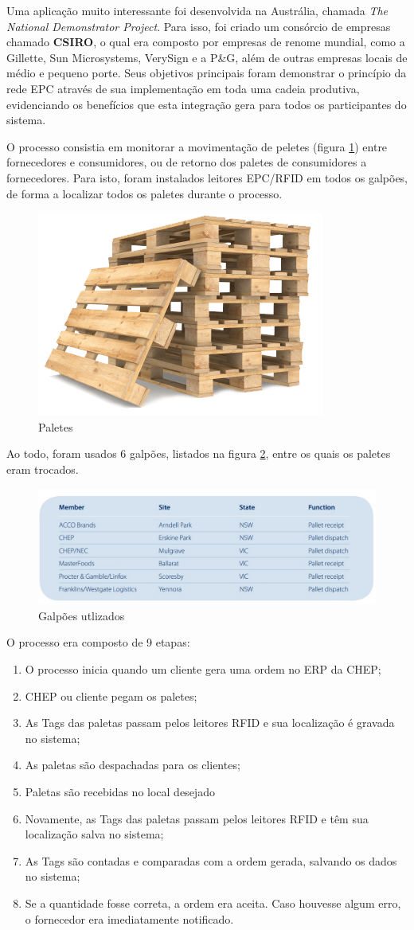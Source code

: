 \documentclass[a4paper,12pt,titlepage]{article}
\begin{document}
	Uma aplicação muito interessante foi desenvolvida na Austrália, chamada \textit{The National Demonstrator Project}. Para isso, foi criado um consórcio de empresas chamado \textbf{CSIRO}, o qual era composto por empresas de renome mundial, como a Gillette, Sun Microsystems, VerySign e a P\&G, além de outras empresas locais de médio e pequeno porte. Seus objetivos principais foram demonstrar o princípio da rede EPC através de sua implementação em toda uma cadeia produtiva, evidenciando os benefícios que esta integração gera para todos os participantes do sistema. 
	
	O processo consistia em monitorar a movimentação de peletes (figura \ref{fig:palete}) entre fornecedores e consumidores, ou de retorno dos paletes de consumidores a fornecedores. Para isto, foram instalados leitores EPC/RFID em todos os galpões, de forma a localizar todos os paletes durante o processo.
	
	\begin{figure}[h!]
		\centering
		\includegraphics[width=0.2\linewidth]{pallet}
		\caption{Paletes}
		\label{fig:palete}
	\end{figure}

	Ao todo, foram usados 6 galpões, listados na figura \ref{fig:sites}, entre os quais os paletes eram trocados.
	
	\begin{figure}[h!]
		\centering
		\includegraphics[width=0.6\linewidth]{sites}
		\caption{Galpões utlizados}
		\label{fig:sites}
	\end{figure}
		
	 
	O processo era composto de 9 etapas:
	\begin{enumerate}
		\item O processo inicia quando um cliente gera uma ordem no ERP da CHEP;  
		\item CHEP ou cliente pegam os paletes;
		\item As Tags das paletas passam pelos leitores RFID e sua localização é gravada no sistema;
		\item As paletas são despachadas para os clientes;
		\item Paletas são recebidas no local desejado
		\item Novamente, as Tags das paletas passam pelos leitores RFID e têm sua localização salva no sistema;
		\item As Tags são contadas e comparadas com a ordem gerada, salvando os dados no sistema;
		\item Se a quantidade fosse correta, a ordem era aceita. Caso houvesse algum erro, o fornecedor era imediatamente notificado.
	\end{enumerate}	
	
\end{document}
